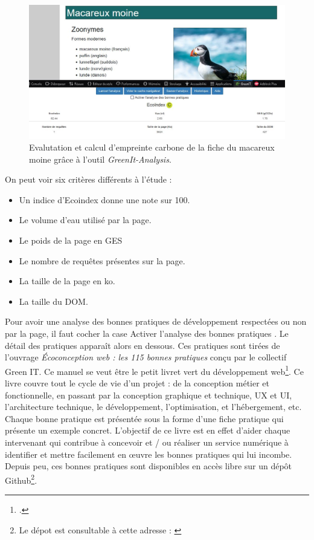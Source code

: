 \documentclass[a4paper,12pt,twoside]{book}
\begin{document}
\begin{figure}[H]
    \centering
    \includegraphics[width=\linewidth]{img/partie_3/greenit.JPG}
    \caption{Evalutation et calcul d'empreinte carbone de la fiche du macareux moine grâce à l'outil \textit{GreenIt-Analysis}.}
\end{figure}


On peut voir six critères différents à l'étude :
\begin{itemize}
    \item Un indice d'Ecoindex donne une note sur 100.
    \item Le volume d'eau utilisé par la page.
    \item Le poids de la page en \acrlong{GES}
    \item Le nombre de requêtes présentes sur la page.
    \item La taille de la page en ko.
    \item La taille du \acrshort{DOM}.
\end{itemize}

Pour avoir une analyse des bonnes pratiques de développement respectées ou non par la page, il faut cocher la case \og Activer l'analyse des bonnes pratiques \fg. Le détail des pratiques apparaît alors en dessous. Ces pratiques sont tirées de l'ouvrage \og \textit{Écoconception web : les 115 bonnes pratiques} \fg{} conçu par le collectif Green IT. Ce manuel se veut être le \og petit livret vert du développement web\fg\footcite{greenit}. Ce livre couvre tout le cycle de vie d’un projet : de la conception métier et fonctionnelle, en passant par la conception graphique et technique, UX et UI, l'architecture technique, le développement, l'optimisation, et l'hébergement, etc. Chaque bonne pratique est présentée sous la forme d'une fiche pratique qui présente un exemple concret. L'objectif de ce livre est en effet d'aider chaque intervenant qui contribue à concevoir et / ou réaliser un service numérique à identifier et mettre facilement en \oe{}uvre les bonnes pratiques qui lui incombe. Depuis peu, ces bonnes pratiques sont disponibles en accès libre sur un dépôt Github\footnote{Le dépot est consultable à cette adresse : \cite{bonnes-pratiques}}.
\end{document}
